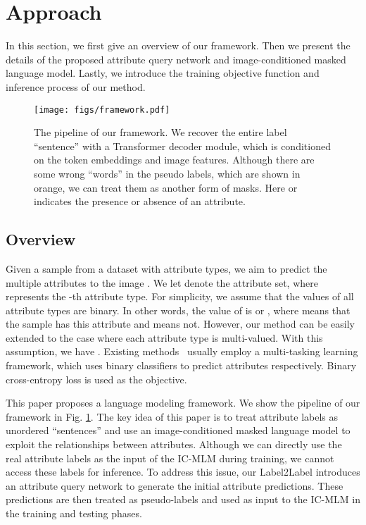 \documentclass[runningheads]{llncs}
\begin{document}
\section{Approach}
In this section, we first give an overview of our framework. Then we present the details of the proposed attribute query network and image-conditioned masked language model. Lastly, we introduce the training objective function and inference process of our method.


\begin{figure}[t]
  \begin{center}
     \texttt{[image: figs/framework.pdf]}
  \end{center}
     \caption{The pipeline of our framework. 
We recover the entire label ``sentence'' with a Transformer decoder module, which is conditioned on the token embeddings and image features. Although there are some wrong ``words'' in the pseudo labels, which are shown in orange, we can treat them as another form of masks. Here  or  indicates the presence or absence of an attribute.}
  \label{fig:flowchart}
  \end{figure}

\subsection{Overview}
Given a sample  from a dataset  with  attribute types, we aim to predict the multiple attributes  to the image . We let  denote the attribute set, where  represents the -th attribute type. For simplicity, we assume that the values of all attribute types are binary. In other words, the value of  is  or , where  means that the sample has this attribute and  means not. However, our method can be easily extended to the case where each attribute type is multi-valued. With this assumption, we have . Existing methods~\cite{jia2021spatial,cao2018partially} usually employ a multi-tasking learning framework, which uses  binary classifiers to predict  attributes respectively. Binary cross-entropy loss is used as the objective.

This paper proposes a language modeling framework. We show the pipeline of our framework in Fig. \ref{fig:flowchart}. The key idea of this paper is to treat attribute labels as unordered ``sentences'' and use an image-conditioned masked language model to exploit the relationships between attributes. Although we can directly use the real attribute labels as the input of the IC-MLM during training, we cannot access these labels for inference. To address this issue, our Label2Label introduces an attribute query network to generate the initial attribute predictions. These predictions are then treated as pseudo-labels and used as input to the IC-MLM in the training and testing phases.
\end{document}
